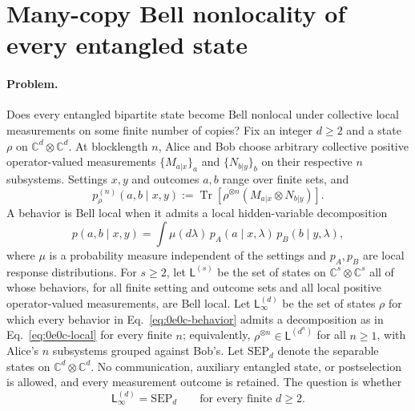 \section{Many-copy Bell nonlocality of every entangled state}
\label{sec:op_0e0ceaac739b74fd}

\paragraph{Problem.}
Does every entangled bipartite state become Bell nonlocal under collective
local measurements on some finite number of copies?  Fix an integer $d\geq2$
and a state $\rho$ on $\mathbb C^d\otimes\mathbb C^d$.  At blocklength $n$,
Alice and Bob choose arbitrary collective positive operator-valued measurements
$\{M_{a|x}\}_a$ and $\{N_{b|y}\}_b$ on their respective $n$ subsystems.
Settings $x,y$ and outcomes $a,b$ range over finite sets, and
\begin{equation}
  p_\rho^{(n)}(a,b\mid x,y)
  :=\operatorname{Tr}\!\left[\rho^{\otimes n}(M_{a|x}\otimes N_{b|y})\right].
  \label{eq:0e0c-behavior}
\end{equation}
A behavior is Bell local when it admits a local hidden-variable decomposition
\begin{equation}
  p(a,b\mid x,y)=\int\mu(d\lambda)\,p_A(a\mid x,\lambda)\,p_B(b\mid y,\lambda),
  \label{eq:0e0c-local}
\end{equation}
where $\mu$ is a probability measure independent of the settings and
$p_A,p_B$ are local response distributions.  For $s\geq2$, let
$\mathsf L^{(s)}$ be the set of states on $\mathbb C^s\otimes\mathbb C^s$ all
of whose behaviors, for all finite setting and outcome sets and all local
positive operator-valued measurements, are Bell local.  Let
$\mathsf L_\infty^{(d)}$ be the set of states $\rho$ for which every behavior
in Eq.~\eqref{eq:0e0c-behavior} admits a decomposition as in
Eq.~\eqref{eq:0e0c-local} for every finite $n$; equivalently,
$\rho^{\otimes n}\in\mathsf L^{(d^n)}$ for all $n\geq1$, with Alice's $n$
subsystems grouped against Bob's.  Let $\mathrm{SEP}_d$ denote the separable
states on $\mathbb C^d\otimes\mathbb C^d$.  No communication, auxiliary
entangled state, or postselection is allowed, and every measurement outcome is
retained.  The question is whether
\begin{equation}
  \mathsf L_\infty^{(d)}=\mathrm{SEP}_d
  \qquad\text{for every finite }d\geq2.
  \label{eq:0e0c-question}
\end{equation}

